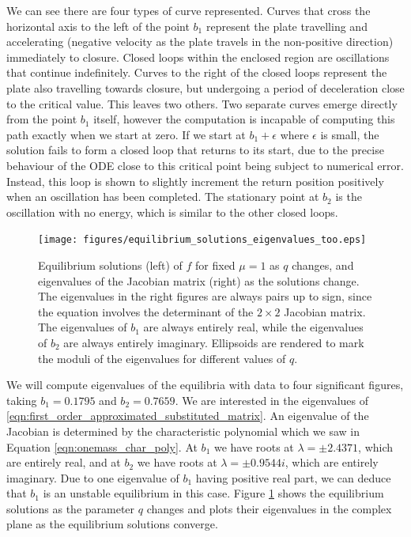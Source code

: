 We can see there are four types of curve represented.
Curves that cross the horizontal axis to the left of the point $b_1$ represent the plate travelling and accelerating (negative velocity as the plate travels in the non-positive direction) immediately to closure.
Closed loops within the enclosed region are oscillations that continue indefinitely.
Curves to the right of the closed loops represent the plate also travelling towards closure,
but undergoing a period of deceleration close to the critical value.
This leaves two others. Two separate curves emerge directly from the point $b_1$ itself,
however the computation is incapable of computing this path exactly when we start at zero.
If we start at $b_1+\epsilon$ where $\epsilon$ is small,
the solution fails to form a closed loop that returns to its start,
due to the precise behaviour of the ODE close to this critical point being subject to numerical error.
Instead, this loop is shown to slightly increment the return position positively when an oscillation has been completed.
The stationary point at $b_2$ is the oscillation with no energy,
which is similar to the other closed loops.
\begin{figure}[h!]
    \centering
    \texttt{[image: figures/equilibrium\_solutions\_eigenvalues\_too.eps]}
    \caption{
        Equilibrium solutions (left) of $f$ for fixed $\mu=1$ as $q$ changes, and eigenvalues of the Jacobian matrix (right) as the solutions change.
        The eigenvalues in the right figures are always pairs up to sign, since the equation involves the determinant of the \(2\times 2\) Jacobian matrix.
        The eigenvalues of $b_1$ are always entirely real, while the eigenvalues of $b_2$ are always entirely imaginary.
        Ellipsoids are rendered to mark the moduli of the eigenvalues for different values of $q$.
    }
    \label{fig:equilibrium_eigenvalues}
\end{figure}

We will compute eigenvalues of the equilibria with data to four significant figures, taking \(b_1 = 0.1795\) and \(b_2 = 0.7659\).
We are interested in the eigenvalues of \ref{eqn:first_order_approximated_substituted_matrix}.
An eigenvalue of the Jacobian is determined by the characteristic polynomial which we saw in Equation \ref{eqn:onemass_char_poly}.
At \(b_1\) we have roots at \(\lambda = \pm 2.4371\), which are entirely real,
and at \(b_2\) we have roots at \(\lambda = \pm 0.9544 i\), which are entirely imaginary.
Due to one eigenvalue of \(b_1\) having positive real part,
we can deduce that $b_1$ is an unstable equilibrium in this case.
Figure \ref{fig:equilibrium_eigenvalues} shows the equilibrium solutions as the parameter $q$ changes and plots their eigenvalues in the complex plane as the equilibrium solutions converge.

